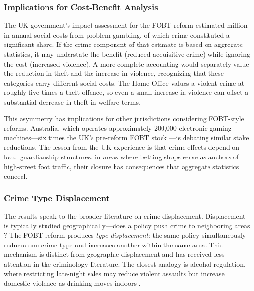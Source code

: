 \documentclass[12pt]{article}
\begin{document}
\subsubsection*{Implications for Cost-Benefit Analysis} The UK government's impact assessment for the FOBT reform estimated  million in annual social costs from problem gambling, of which crime constituted a significant share. If the crime component of that estimate is based on aggregate statistics, it may understate the benefit (reduced acquisitive crime) while ignoring the cost (increased violence). A more complete accounting would separately value the reduction in theft and the increase in violence, recognizing that these categories carry different social costs. The Home Office values a violent crime at roughly five times a theft offence, so even a small increase in violence can offset a substantial decrease in theft in welfare terms.

This asymmetry has implications for other jurisdictions considering FOBT-style reforms. Australia, which operates approximately 200,000 electronic gaming machines---six times the UK's pre-reform FOBT stock \citep{rockloff2022machines}---is debating similar stake reductions. The lesson from the UK experience is that crime effects depend on local guardianship structures: in areas where betting shops serve as anchors of high-street foot traffic, their closure has consequences that aggregate statistics conceal.

\subsubsection*{Crime Type Displacement} The results speak to the broader literature on crime displacement. Displacement is typically studied geographically---does a policy push crime to neighboring areas \citep{weisburd2006does}? The FOBT reform produces \textit{type displacement}: the same policy simultaneously reduces one crime type and increases another within the same area. This mechanism is distinct from geographic displacement and has received less attention in the criminology literature. The closest analogy is alcohol regulation, where restricting late-night sales may reduce violent assaults but increase domestic violence as drinking moves indoors \citep{carpenter2007heavy}.
\end{document}
